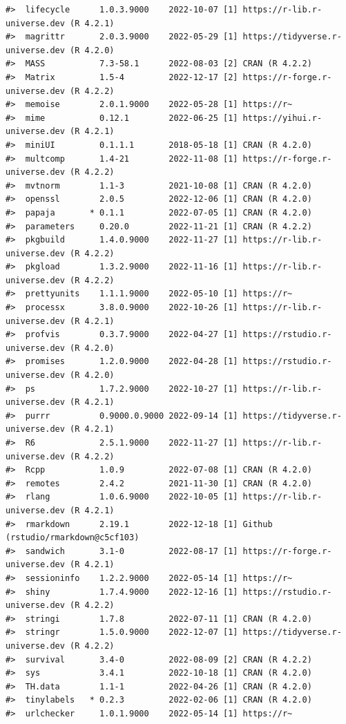 \documentclass[
  number]{elsarticle}
\begin{document}
\begin{verbatim}
#>  lifecycle      1.0.3.9000    2022-10-07 [1] https://r-lib.r-universe.dev (R 4.2.1)
#>  magrittr       2.0.3.9000    2022-05-29 [1] https://tidyverse.r-universe.dev (R 4.2.0)
#>  MASS           7.3-58.1      2022-08-03 [2] CRAN (R 4.2.2)
#>  Matrix         1.5-4         2022-12-17 [2] https://r-forge.r-universe.dev (R 4.2.2)
#>  memoise        2.0.1.9000    2022-05-28 [1] https://r~
#>  mime           0.12.1        2022-06-25 [1] https://yihui.r-universe.dev (R 4.2.1)
#>  miniUI         0.1.1.1       2018-05-18 [1] CRAN (R 4.2.0)
#>  multcomp       1.4-21        2022-11-08 [1] https://r-forge.r-universe.dev (R 4.2.2)
#>  mvtnorm        1.1-3         2021-10-08 [1] CRAN (R 4.2.0)
#>  openssl        2.0.5         2022-12-06 [1] CRAN (R 4.2.0)
#>  papaja       * 0.1.1         2022-07-05 [1] CRAN (R 4.2.0)
#>  parameters     0.20.0        2022-11-21 [1] CRAN (R 4.2.2)
#>  pkgbuild       1.4.0.9000    2022-11-27 [1] https://r-lib.r-universe.dev (R 4.2.2)
#>  pkgload        1.3.2.9000    2022-11-16 [1] https://r-lib.r-universe.dev (R 4.2.2)
#>  prettyunits    1.1.1.9000    2022-05-10 [1] https://r~
#>  processx       3.8.0.9000    2022-10-26 [1] https://r-lib.r-universe.dev (R 4.2.1)
#>  profvis        0.3.7.9000    2022-04-27 [1] https://rstudio.r-universe.dev (R 4.2.0)
#>  promises       1.2.0.9000    2022-04-28 [1] https://rstudio.r-universe.dev (R 4.2.0)
#>  ps             1.7.2.9000    2022-10-27 [1] https://r-lib.r-universe.dev (R 4.2.1)
#>  purrr          0.9000.0.9000 2022-09-14 [1] https://tidyverse.r-universe.dev (R 4.2.1)
#>  R6             2.5.1.9000    2022-11-27 [1] https://r-lib.r-universe.dev (R 4.2.2)
#>  Rcpp           1.0.9         2022-07-08 [1] CRAN (R 4.2.0)
#>  remotes        2.4.2         2021-11-30 [1] CRAN (R 4.2.0)
#>  rlang          1.0.6.9000    2022-10-05 [1] https://r-lib.r-universe.dev (R 4.2.1)
#>  rmarkdown      2.19.1        2022-12-18 [1] Github (rstudio/rmarkdown@c5cf103)
#>  sandwich       3.1-0         2022-08-17 [1] https://r-forge.r-universe.dev (R 4.2.1)
#>  sessioninfo    1.2.2.9000    2022-05-14 [1] https://r~
#>  shiny          1.7.4.9000    2022-12-16 [1] https://rstudio.r-universe.dev (R 4.2.2)
#>  stringi        1.7.8         2022-07-11 [1] CRAN (R 4.2.0)
#>  stringr        1.5.0.9000    2022-12-07 [1] https://tidyverse.r-universe.dev (R 4.2.2)
#>  survival       3.4-0         2022-08-09 [2] CRAN (R 4.2.2)
#>  sys            3.4.1         2022-10-18 [1] CRAN (R 4.2.0)
#>  TH.data        1.1-1         2022-04-26 [1] CRAN (R 4.2.0)
#>  tinylabels   * 0.2.3         2022-02-06 [1] CRAN (R 4.2.0)
#>  urlchecker     1.0.1.9000    2022-05-14 [1] https://r~

\end{verbatim}
\end{document}
